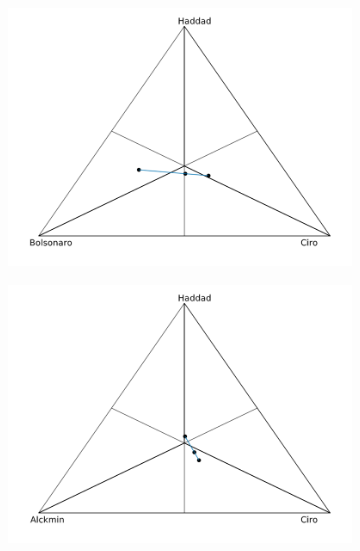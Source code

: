 \documentclass[hidelinks,11pt]{article}
\begin{document}
   \begin{figure}
        \centering
        \begin{subfigure}[b]{0.475\textwidth}
            \centering
            \includegraphics[width=\textwidth]{./images/cw2_nota.png}
             \caption{}%
            \label{fig:notac2}
        \end{subfigure}
        \hfill
        \begin{subfigure}[b]{0.475\textwidth}
            \centering
            \includegraphics[width=\textwidth]{./images/cw2_notb.png}
             \caption{}%
            \label{fig:notbc2}
        \end{subfigure}

\end{figure}
\end{document}
